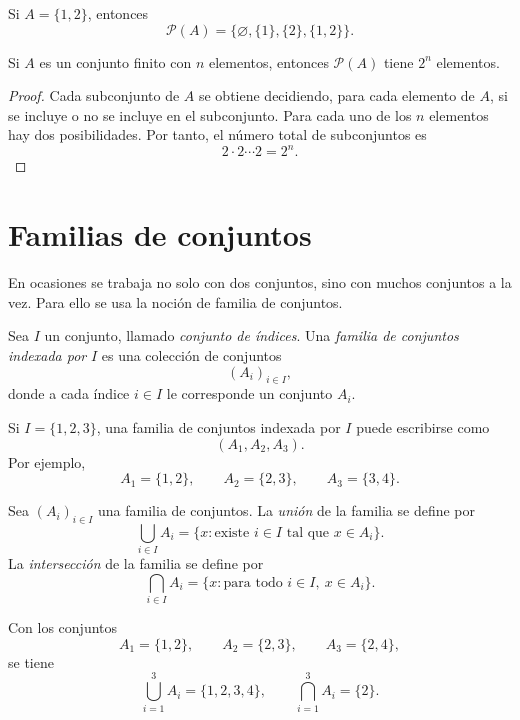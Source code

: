 \begin{ejemplo}
Si \(A=\{1,2\}\), entonces
\[
  \mathcal{P}(A)=\{\varnothing,\{1\},\{2\},\{1,2\}\}.
\]
\end{ejemplo}

\begin{proposicion}
Si \(A\) es un conjunto finito con \(n\) elementos, entonces \(\mathcal{P}(A)\) tiene \(2^n\) elementos.
\end{proposicion}

\begin{proof}
Cada subconjunto de \(A\) se obtiene decidiendo, para cada elemento de \(A\), si se incluye o no se incluye en el subconjunto. Para cada uno de los \(n\) elementos hay dos posibilidades. Por tanto, el número total de subconjuntos es
\[
  2\cdot 2\cdots 2 = 2^n.
\]
\end{proof}

\section{Familias de conjuntos}

En ocasiones se trabaja no solo con dos conjuntos, sino con muchos conjuntos a la vez. Para ello se usa la noción de familia de conjuntos.

\begin{definicion}
Sea \(I\) un conjunto, llamado \emph{conjunto de índices}. Una \emph{familia de conjuntos indexada por} \(I\) es una colección de conjuntos
\[
  (A_i)_{i\in I},
\]
donde a cada índice \(i\in I\) le corresponde un conjunto \(A_i\).
\end{definicion}

\begin{ejemplo}
Si \(I=\{1,2,3\}\), una familia de conjuntos indexada por \(I\) puede escribirse como
\[
  (A_1,A_2,A_3).
\]
Por ejemplo,
\[
  A_1=\{1,2\},\qquad A_2=\{2,3\},\qquad A_3=\{3,4\}.
\]
\end{ejemplo}

\begin{definicion}
Sea \((A_i)_{i\in I}\) una familia de conjuntos. La \emph{unión} de la familia se define por
\[
  \bigcup_{i\in I} A_i = \{x : \text{existe } i\in I \text{ tal que } x\in A_i\}.
\]
La \emph{intersección} de la familia se define por
\[
  \bigcap_{i\in I} A_i = \{x : \text{para todo } i\in I,\ x\in A_i\}.
\]
\end{definicion}

\begin{ejemplo}
Con los conjuntos
\[
  A_1=\{1,2\},\qquad A_2=\{2,3\},\qquad A_3=\{2,4\},
\]
se tiene
\[
  \bigcup_{i=1}^3 A_i = \{1,2,3,4\},
  \qquad
  \bigcap_{i=1}^3 A_i = \{2\}.
\]
\end{ejemplo}

